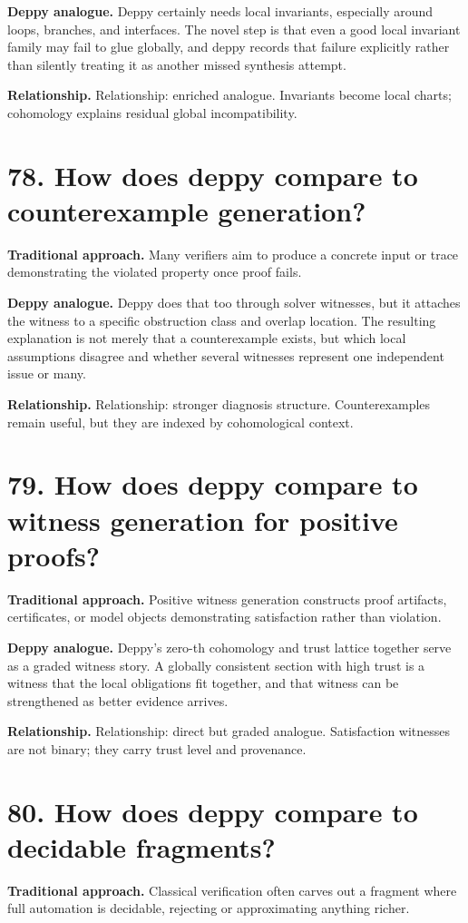 \documentclass[11pt,openany]{book}
\begin{document}
\textbf{Deppy analogue.} Deppy certainly needs local invariants, especially around loops, branches, and interfaces. The novel step is that even a good local invariant family may fail to glue globally, and deppy records that failure explicitly rather than silently treating it as another missed synthesis attempt.

\textbf{Relationship.} Relationship: enriched analogue. Invariants become local charts; cohomology explains residual global incompatibility.

\section*{78. How does deppy compare to counterexample generation?}
\textbf{Traditional approach.} Many verifiers aim to produce a concrete input or trace demonstrating the violated property once proof fails.

\textbf{Deppy analogue.} Deppy does that too through solver witnesses, but it attaches the witness to a specific obstruction class and overlap location. The resulting explanation is not merely that a counterexample exists, but which local assumptions disagree and whether several witnesses represent one independent issue or many.

\textbf{Relationship.} Relationship: stronger diagnosis structure. Counterexamples remain useful, but they are indexed by cohomological context.

\section*{79. How does deppy compare to witness generation for positive proofs?}
\textbf{Traditional approach.} Positive witness generation constructs proof artifacts, certificates, or model objects demonstrating satisfaction rather than violation.

\textbf{Deppy analogue.} Deppy's zero-th cohomology and trust lattice together serve as a graded witness story. A globally consistent section with high trust is a witness that the local obligations fit together, and that witness can be strengthened as better evidence arrives.

\textbf{Relationship.} Relationship: direct but graded analogue. Satisfaction witnesses are not binary; they carry trust level and provenance.

\section*{80. How does deppy compare to decidable fragments?}
\textbf{Traditional approach.} Classical verification often carves out a fragment where full automation is decidable, rejecting or approximating anything richer.
\end{document}
